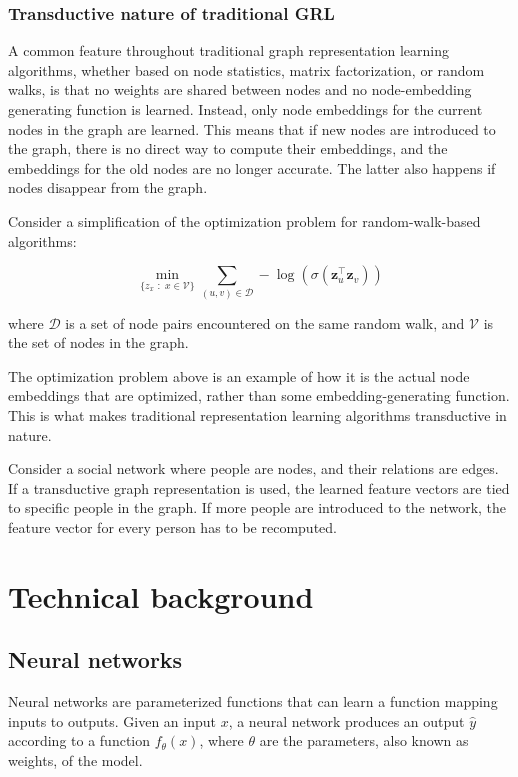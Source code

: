 \documentclass[PhD]{uclathes}
\begin{document}
\subsubsection{Transductive nature of traditional GRL}
A common feature throughout traditional graph representation learning
algorithms, whether based on node statistics, matrix factorization, or random
walks, is that no weights are shared between nodes and no node-embedding
generating function is learned. Instead, only node embeddings for the current
nodes in the graph are learned. This means that if new nodes are introduced to
the graph, there is no direct way to compute their embeddings, and the
embeddings for the old nodes are no longer accurate. The latter also happens if
nodes disappear from the graph.

Consider a simplification of the optimization problem for random-walk-based
algorithms:

\[
\min_{\{z_x \,\,: \,\,x \in \mathcal{V} \}}
\sum_{(u,v)\in\mathcal{D}}
-\log\left(\sigma(\mathbf{z}_u^\top \mathbf{z}_v)\right)
\]

where $\mathcal{D}$ is a set of node pairs encountered on the same random walk,
and $\mathcal{V}$ is the set of nodes in the graph.

The optimization problem above is an example of how it is the actual node
embeddings that are optimized, rather than some embedding-generating function.
This is what makes traditional representation learning algorithms transductive
in nature.

Consider a social network where people are nodes, and their relations are
edges. If a transductive graph representation is used, the learned feature
vectors are tied to specific people in the graph. If more people are introduced
to the network, the feature vector for every person has to be recomputed.

\section{Technical background}
\subsection{Neural networks}
Neural networks are parameterized functions that can learn a function mapping
inputs to outputs. Given an input $x$, a neural network produces an output
$\hat{y}$ according to a function $f_{\theta}(x)$, where $\theta$ are the
parameters, also known as weights, of the model.
\end{document}
